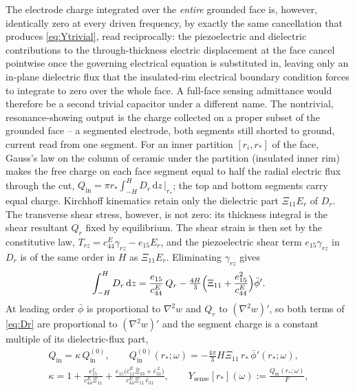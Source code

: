 \documentclass[11pt]{article}
\newcommand{\eebar}{\bar{e}_{31}}
\newcommand{\Xibar}{\bar{\Xi}_{33}}
\newcommand{\cbar}{\bar{c}_{11}^{E}}
\begin{document}
The electrode charge integrated over the \emph{entire} grounded face is,
however, identically zero at every driven frequency, by exactly the same
cancellation that produces \eqref{eq:Ytrivial}, read reciprocally: the
piezoelectric and dielectric contributions to the through-thickness
electric displacement at the face cancel pointwise once the governing
electrical equation is substituted in, leaving only an in-plane dielectric
flux that the insulated-rim electrical boundary condition forces to
integrate to zero over the whole face. A full-face sensing admittance
would therefore be a second trivial capacitor under a different name.
The nontrivial, resonance-showing output is the charge collected on a
proper subset of the grounded face -- a segmented electrode, both
segments still shorted to ground, current read from one segment. For an
inner partition $[r_i,r_*]$ of the face, Gauss's law on the column of
ceramic under the partition (insulated inner rim) makes the free charge
on each face segment equal to half the radial electric flux through the
cut, $Q_{\mathrm{in}}=\pi r_*\int_{-H}^{H}D_r\,\mathrm dz\,\big|_{r_*}$;
the top and bottom segments carry equal charge. Kirchhoff kinematics
retain only the dielectric part $\Xi_{11}E_r$ of $D_r$. The transverse
shear stress, however, is not zero: its thickness integral is the shear
resultant $Q_r$ fixed by equilibrium. The shear strain is then set by the
constitutive law, $T_{rz}=c_{44}^E\gamma_{rz}-e_{15}E_r$, and the
piezoelectric shear term $e_{15}\gamma_{rz}$ in $D_r$ is of the same order
in $H$ as $\Xi_{11}E_r$. Eliminating $\gamma_{rz}$ gives
\begin{equation}
\int_{-H}^{H}D_r\,\mathrm dz=\frac{e_{15}}{c_{44}^E}\,Q_r
-\tfrac{4H}{3}\Bigl(\Xi_{11}+\frac{e_{15}^2}{c_{44}^E}\Bigr)\bar\phi'.
\label{eq:Dr}
\end{equation}
At leading order $\bar\phi$ is proportional to $\nabla^2w$ and $Q_r$ to
$(\nabla^2w)'$, so both terms of \eqref{eq:Dr} are proportional to
$(\nabla^2w)'$ and the segment charge is a constant multiple of its
dielectric-flux part,
\begin{equation}
\begin{gathered}
Q_{\mathrm{in}}=\kappa\,Q_{\mathrm{in}}^{(0)},\qquad
Q_{\mathrm{in}}^{(0)}(r_*;\omega)=-\tfrac{4\pi}{3}H\Xi_{11}\,r_*\,\bar\phi'(r_*;\omega),\\
\kappa=1+\frac{e_{15}^2}{c_{44}^E\Xi_{11}}
+\frac{e_{15}\bigl(\cbar\Xibar+\eebar^{\,2}\bigr)}{c_{44}^E\Xi_{11}\,\eebar},\qquad
Y_{\mathrm{sense}}[r_*](\omega):=\frac{Q_{\mathrm{in}}(r_*;\omega)}{F},
\end{gathered}
\label{eq:Ysense}
\end{equation}
\end{document}
